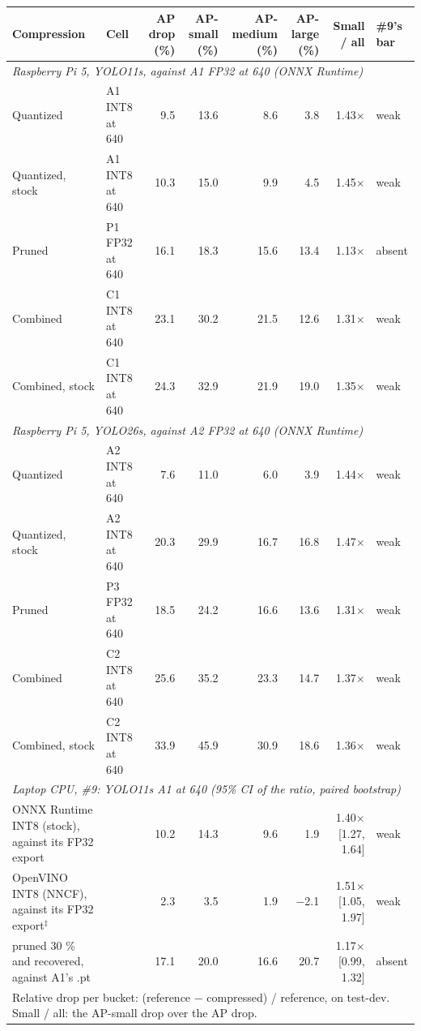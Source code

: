 \begin{tabular}{llrrrrrl}
\toprule
Compression & Cell & AP drop (\%) & AP-small (\%) & AP-medium (\%) & AP-large (\%) & Small / all & \#9's bar \\
\midrule
\multicolumn{8}{l}{\textit{Raspberry Pi 5, YOLO11s, against A1 FP32 at 640 (ONNX Runtime)}} \\
Quantized & A1 INT8 at 640 & 9.5 & 13.6 & 8.6 & 3.8 & 1.43$\times$ & weak \\
Quantized, stock & A1 INT8 at 640 & 10.3 & 15.0 & 9.9 & 4.5 & 1.45$\times$ & weak \\
Pruned & P1 FP32 at 640 & 16.1 & 18.3 & 15.6 & 13.4 & 1.13$\times$ & absent \\
Combined & C1 INT8 at 640 & 23.1 & 30.2 & 21.5 & 12.6 & 1.31$\times$ & weak \\
Combined, stock & C1 INT8 at 640 & 24.3 & 32.9 & 21.9 & 19.0 & 1.35$\times$ & weak \\
\midrule
\multicolumn{8}{l}{\textit{Raspberry Pi 5, YOLO26s, against A2 FP32 at 640 (ONNX Runtime)}} \\
Quantized & A2 INT8 at 640 & 7.6 & 11.0 & 6.0 & 3.9 & 1.44$\times$ & weak \\
Quantized, stock & A2 INT8 at 640 & 20.3 & 29.9 & 16.7 & 16.8 & 1.47$\times$ & weak \\
Pruned & P3 FP32 at 640 & 18.5 & 24.2 & 16.6 & 13.6 & 1.31$\times$ & weak \\
Combined & C2 INT8 at 640 & 25.6 & 35.2 & 23.3 & 14.7 & 1.37$\times$ & weak \\
Combined, stock & C2 INT8 at 640 & 33.9 & 45.9 & 30.9 & 18.6 & 1.36$\times$ & weak \\
\midrule
\multicolumn{8}{l}{\textit{Laptop CPU, \#9: YOLO11s A1 at 640 (95\% CI of the ratio, paired bootstrap)}} \\
ONNX Runtime INT8 (stock), against its FP32 export &  & 10.2 & 14.3 & 9.6 & 1.9 & 1.40$\times$ [1.27, 1.64] & weak \\
OpenVINO INT8 (NNCF), against its FP32 export$^{\ddagger}$ &  & 2.3 & 3.5 & 1.9 & $-$2.1 & 1.51$\times$ [1.05, 1.97] & weak \\
pruned 30 \% and recovered, against A1's .pt &  & 17.1 & 20.0 & 16.6 & 20.7 & 1.17$\times$ [0.99, 1.32] & absent \\
\bottomrule
\multicolumn{8}{l}{\footnotesize Relative drop per bucket: (reference $-$ compressed) / reference, on test-dev. Small / all: the AP-small drop over the AP drop.} \\

\end{tabular}
